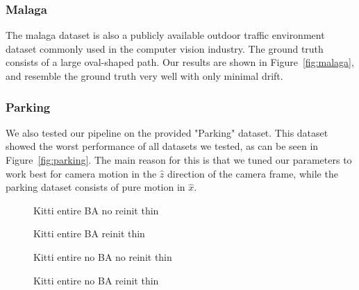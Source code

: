 \documentclass[11pt]{article}
\newlength\figureheight
\newlength\figurewidth
\begin{document}
\subsubsection{Malaga}
The malaga dataset is also a publicly available outdoor traffic environment dataset commonly used in the computer vision industry. The ground truth consists of a large oval-shaped path. Our results are shown in Figure~\ref{fig:malaga}, and resemble the ground truth very well with only minimal drift.

\subsubsection{Parking}
We also tested our pipeline on the provided "Parking" dataset. This dataset showed the worst performance of all datasets we tested, as can be seen in Figure~\ref{fig:parking}. The main reason for this is that we tuned our parameters to work best for camera motion in the $\hat{z}$ direction of the camera frame, while the parking dataset consists of pure motion in $\hat{x}$.

\begin{figure}[h]
	\centering
	\setlength\figureheight{10cm} 
	\setlength\figurewidth{15cm}
	
	\caption{Kitti entire BA no reinit thin}
	\label{fig:Kitti_entire_BA_no_reinit_thin}
\end{figure}

\begin{figure}[h]
	\centering
	\setlength\figureheight{10cm} 
	\setlength\figurewidth{15cm}
	
	\caption{Kitti entire BA reinit thin}
	\label{fig:Kitti_entire_BA_reinit_thin}
\end{figure}

\begin{figure}[h]
	\centering
	\setlength\figureheight{10cm} 
	\setlength\figurewidth{15cm}
	
	\caption{Kitti entire no BA no reinit thin}
	\label{fig:Kitti_entire_no_BA_no_reinit_thin}
\end{figure}

\begin{figure}[h]
	\centering
	\setlength\figureheight{10cm} 
	\setlength\figurewidth{15cm}
	
	\caption{Kitti entire no BA reinit thin}
	\label{fig:Kitti_entire_no_BA_reinit_thin}
\end{figure}
\end{document}
